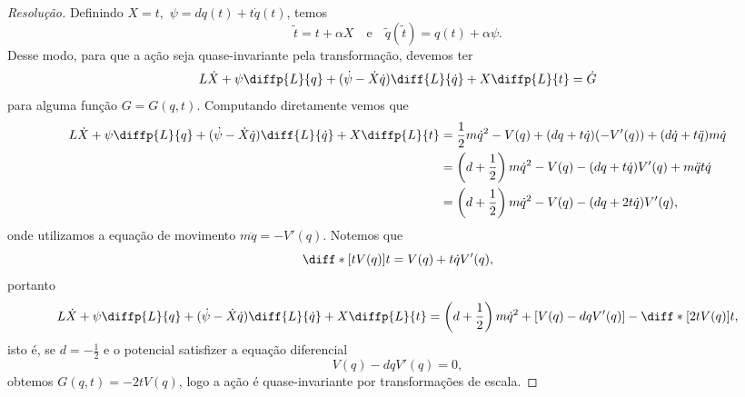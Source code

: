 \begin{proof}[Resolução]
    Definindo \(X = t,\) \(\psi = d q(t) + t \dot{q}(t)\), temos
    \begin{equation*}
        \tilde{t} = t + \alpha X\quad\text{e}\quad\tilde{q}(\tilde{t}) = q(t) + \alpha \psi.
    \end{equation*}
    Desse modo, para que a ação seja quase-invariante pela transformação, devemos ter
    \begin{equation*}
        L \dot{X} + \psi \diffp{L}{q} + (\dot{\psi} - \dot{X}\dot{q})\diff{L}{\dot{q}} + X \diffp{L}{t} = \dot{G}
    \end{equation*}
    para alguma função \(G = G(q, t)\). Computando diretamente vemos que
    \begin{align*}
        L \dot{X} + \psi \diffp{L}{q} + (\dot{\psi} - \dot{X}\dot{q})\diff{L}{\dot{q}} + X \diffp{L}{t} &= \frac12 m\dot{q}^2 - V(q) + (dq + t\dot{q})(-V'(q)) + (d\dot{q} + t\ddot{q})m\dot{q}\\
                                                                                                                &= \left(d + \frac12\right)m\dot{q}^2 - V(q) - (dq + t\dot{q})V'(q) + m\ddot{q} t\dot{q}\\
                                                                                                                &= \left(d + \frac12\right)m\dot{q}^2 -V(q) - (dq + 2t\dot{q})V'(q),
    \end{align*}
    onde utilizamos a equação de movimento \(m\ddot{q} = -V'(q)\). Notemos que
    \begin{equation*}
        \diff*{\left[tV(q)\right]}{t} = V(q) + t\dot{q}V'(q),
    \end{equation*}
    portanto
    \begin{equation*}
        L \dot{X} + \psi \diffp{L}{q} + (\dot{\psi} - \dot{X}\dot{q})\diff{L}{\dot{q}} + X \diffp{L}{t}  = \left(d + \frac12\right)m\dot{q}^2 + \left[V(q) - dqV'(q)\right] - \diff*{\left[2tV(q)\right]}{t},
    \end{equation*}
    isto é, se \(d = -\frac12\) e o potencial satisfizer a equação diferencial
    \begin{equation*}
        V(q) - dqV'(q) = 0,
    \end{equation*}
    obtemos \(G(q, t) = -2 tV(q)\), logo a ação é quase-invariante por transformações de escala.


\end{proof}
